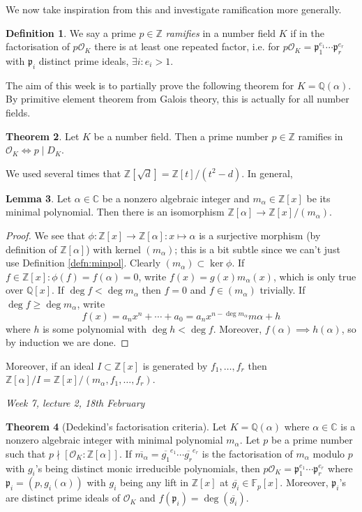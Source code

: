 \documentclass{article}
\newcommand{\Z}{\mathbb{Z}}
\newcommand{\Q}{\mathbb{Q}}
\newcommand{\C}{\mathbb{C}}
\newcommand{\F}{\mathbb{F}}
\newcommand{\ri}{\mathcal{O}}
\newcommand{\ip}{\mathfrak{p}}
\theoremstyle{definition}
\newtheorem{defn}{Definition}[subsection]
\newtheorem{thm}[defn]{Theorem}
\newtheorem{lemma}[defn]{Lemma}
\begin{document}
We now take inspiration from this and investigate ramification more generally.

\begin{defn}
We say a prime $p\in\Z$ \textit{ramifies} in a number field $K$ if in the factorisation of $p\ri_K$ there is at least one repeated factor, i.e. for $p\ri_K=\ip_1^{e_1}\cdots\ip_r^{e_r}$ with $\ip_i$ distinct prime ideals, $\exists i:e_i>1$.
\end{defn}

The aim of this week is to partially prove the following theorem for $K=\Q(\alpha)$. By primitive element theorem from Galois theory, this is actually for all number fields.

\begin{thm}
\label{thm:pramiffpdivdisc}
Let $K$ be a number field. Then a prime number $p\in\Z$ ramifies in $\ri_K\iff p\mid D_K$.
\end{thm}

We used several times that $\Z\left[\sqrt d\right]=\Z[t]/\left(t^2-d\right)$. In general,

\begin{lemma}
Let $\alpha\in\C$ be a nonzero algebraic integer and $m_\alpha\in\Z[x]$ be its minimal polynomial. Then there is an isomorphism $\Z[\alpha]\rightarrow\Z[x]/(m_\alpha)$.
\end{lemma}
\begin{proof}
We see that $\phi:\Z[x]\rightarrow\Z[\alpha]:x\mapsto\alpha$ is a surjective morphism (by definition of $\Z[\alpha]$) with kernel $(m_\alpha)$; this is a bit subtle since we can't just use Definition \ref{defn:minpol}. Clearly $(m_\alpha)\subset\ker\phi$. If $f\in\Z[x]:\phi(f)=f(\alpha)=0$, write $f(x)=g(x)m_\alpha(x)$, which is only true over $\Q[x]$. If $\deg f<\deg m_\alpha$ then $f=0$ and $f\in (m_\alpha)$ trivially. If $\deg f\geq \deg m_\alpha$, write
\[
f(x)=a_nx^n+\cdots+a_0=a_nx^{n-\deg m_\alpha}m\alpha+h
\]
where $h$ is some polynomial with $\deg h<\deg f$. Moreover, $f(\alpha)\implies h(\alpha)$, so by induction we are done.
\end{proof}

Moreover, if an ideal $I\subset\Z[x]$ is generated by $f_1,\ldots,f_r$ then $\Z[\alpha]/I=\Z[x]/(m_\alpha,f_1,\ldots,f_r)$.

\begin{flushright}
\textit{Week 7, lecture 2, 18th February}
\end{flushright}

\begin{thm}[Dedekind's factorisation criteria]
\label{thm:DedekindKummer}
Let $K=\Q(\alpha)$ where $\alpha\in\C$ is a nonzero algebraic integer with minimal polynomial $m_\alpha$. Let $p$ be a prime number such that $p\nmid [\ri_K:\Z[\alpha]]$. If $\overline{m_\alpha}=\overline{g_1}^{e_1}\cdots\overline{g_r}^{e_r}$ is the factorisation of $m_\alpha$ modulo $p$ with $g_i$'s being distinct monic irreducible polynomials, then $p\ri_K=\ip_1^{e_1}\cdots\ip_r^{e_r}$ where $\ip_i=(p,g_i(\alpha))$ with $g_i$ being any lift in $\Z[x]$ at $\overline{g_i}\in\F_p[x]$. Moreover, $\ip_i$'s are distinct prime ideals of $\ri_K$ and $f(\ip_i)=\deg\left(\overline{g_i}\right)$.
\end{thm}
\end{document}
